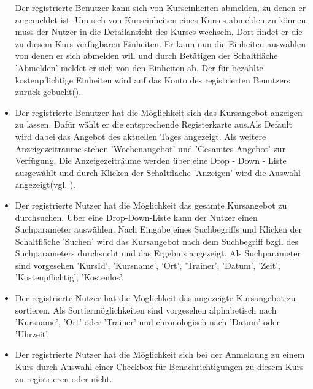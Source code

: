 \documentclass[a4paper]{scrreprt}
\begin{document}
\begin{itemize}
	Der registrierte Benutzer kann sich von Kurseinheiten abmelden, zu denen er angemeldet ist. Um sich von Kurseinheiten eines Kurses abmelden zu können, muss der Nutzer in die Detailansicht des Kurses wechseln. Dort findet er die zu diesem Kurs verfügbaren Einheiten.
	Er kann nun die Einheiten auswählen von denen er sich abmelden will und durch Betätigen der Schaltfläche 'Abmelden' meldet er sich von den Einheiten ab. Der für bezahlte kostenpflichtige Einheiten wird auf das Konto des registrierten Benutzers zurück gebucht().
	\item {}
	Der registrierte Benutzer hat die Möglichkeit sich das Kursangebot anzeigen zu lassen. Dafür wählt er die entsprechende Registerkarte aus.Als Default wird dabei das Angebot des aktuellen Tages angezeigt. Als weitere Anzeigezeiträume stehen 'Wochenangebot' und 'Gesamtes Angebot' zur Verfügung. Die Anzeigezeiträume werden über eine Drop - Down - Liste ausgewählt und durch Klicken der Schaltfläche 'Anzeigen' wird die Auswahl angezeigt(vgl. ).
	\item {}
	Der registrierte Nutzer hat die Möglichkeit das gesamte Kursangebot zu durchsuchen. Über eine Drop-Down-Liste kann der Nutzer einen Suchparameter auswählen. Nach Eingabe eines Suchbegriffs und Klicken der Schaltfläche 'Suchen' wird das Kursangebot nach dem Suchbegriff bzgl. des Suchparameters durchsucht und das Ergebnis angezeigt. 
	Als Suchparameter sind vorgesehen 'KursId', 'Kursname', 'Ort', 'Trainer', 'Datum', 'Zeit', 'Kostenpflichtig', 'Kostenlos'.
	\item {}
	Der registrierte Nutzer hat die Möglichkeit das angezeigte Kursangebot zu sortieren. Als Sortiermöglichkeiten sind vorgesehen alphabetisch nach 'Kursname', 'Ort' oder 'Trainer' und chronologisch nach 'Datum' oder 'Uhrzeit'.
	\item {}
	Der registrierte Nutzer hat die Möglichkeit sich bei der Anmeldung zu einem Kurs durch Auswahl einer Checkbox  für Benachrichtigungen zu diesem Kurs zu registrieren oder nicht.
	
\end{itemize}
\end{document}
